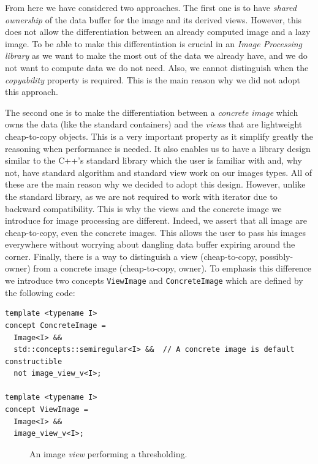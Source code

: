 From here we have considered two approaches. The first one is to have \emph{shared ownership} of the data buffer for the
image and its derived views. However, this does not allow the differentiation between an already computed image and a
lazy image. To be able to make this differentiation is crucial in an \emph{Image Processing library} as we want to make
the most out of the data we already have, and we do not want to compute data we do not need. Also, we cannot distinguish
when the \emph{copyability} property is required. This is the main reason why we did not adopt this approach.

The second one is to make the differentiation between a \emph{concrete image} which owns the data (like the standard
containers) and the \emph{views} that are lightweight cheap-to-copy objects. This is a very important property as it
simplify greatly the reasoning when performance is needed. It also enables us to have a library design similar to the
C++'s standard library which the user is familiar with and, why not, have standard algorithm and standard view work on
our images types. All of these are the main reason why we decided to adopt this design. However, unlike the standard
library, as we are not required to work with iterator due to backward compatibility. This is why the views and the
concrete image we introduce for image processing are different. Indeed, we assert that all image are cheap-to-copy, even
the concrete images. This allows the user to pass his images everywhere without worrying about dangling data buffer
expiring around the corner. Finally, there is a way to distinguish a view (cheap-to-copy, possibly-owner) from a
concrete image (cheap-to-copy, owner). To emphasis this difference we introduce two concepts \texttt{ViewImage} and
\texttt{ConcreteImage} which are defined by the following code:
\begin{verbatim}
template <typename I>
concept ConcreteImage =
  Image<I> &&
  std::concepts::semiregular<I> &&  // A concrete image is default constructible
  not image_view_v<I>;

template <typename I>
concept ViewImage =
  Image<I> &&
  image_view_v<I>;
\end{verbatim}

\begin{figure}[htbp]
  \centering
  \begin{minipage}{\linewidth}
    
  \end{minipage}
  \caption{An image \emph{view} performing a thresholding.}
  \label{fig.view.threshold}
\end{figure}

